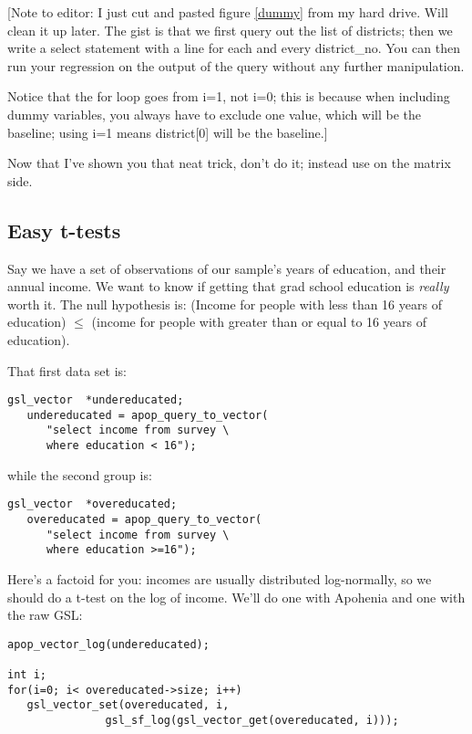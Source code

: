
[Note to editor: I just cut and pasted figure \ref{dummy} from my hard drive. Will clean it up
later. The gist is that we first query out the list of districts; then we write a
select statement with a line  for
each and every district\_no. You can then run your regression on the output of the
query without any further manipulation.

Notice that the for loop goes from i=1, not i=0; this is because when including
dummy variables, you always have to exclude one value, which will be the baseline;
using i=1 means district[0] will be the baseline.]

Now that I've shown you that neat trick, don't do it; instead use
 on the matrix side.

\subsection{Easy t-tests}
Say we have a set of observations of our sample's years of education, and their annual income. We want to
know if getting that grad school education is {\it really} worth it. The null hypothesis is: (Income for
people with less than 16 years of education) $\leq$ (income for people with greater than or equal to 16 years
of education).

That first data set is:
\begin{lstlisting}
gsl_vector	*undereducated;
   undereducated = apop_query_to_vector(
      "select income from survey \
      where education < 16");
\end{lstlisting}
while the second group is:
\begin{lstlisting}
gsl_vector	*overeducated;
   overeducated = apop_query_to_vector(
      "select income from survey \
      where education >=16");
\end{lstlisting}

Here's a factoid for you: incomes are usually distributed log-normally, so we should do a t-test on the
log of income. We'll do one with Apohenia and one with the raw GSL:
\begin{lstlisting}
apop_vector_log(undereducated);

int i;
for(i=0; i< overeducated->size; i++)
   gsl_vector_set(overeducated, i, 
               gsl_sf_log(gsl_vector_get(overeducated, i)));
\end{lstlisting}

